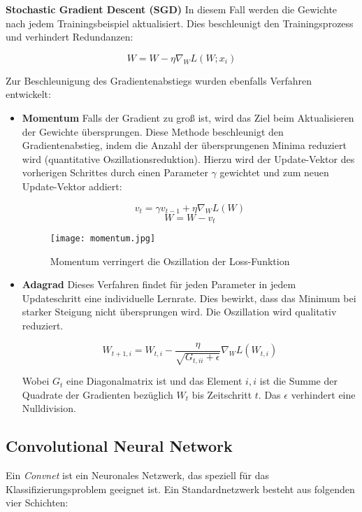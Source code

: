 \documentclass[11pt,ceqn]{book}
\begin{document}
\textbf{Stochastic Gradient Descent (SGD)}
In diesem Fall werden die Gewichte nach jedem Trainingsbeispiel aktualisiert. Dies beschleunigt den Trainingsprozess und verhindert Redundanzen:

\[W=W - \eta \nabla_W L(W;x_i)\]

\bigskip
Zur Beschleunigung des Gradientenabstiegs wurden ebenfalls Verfahren entwickelt:
\begin{itemize}
\item \textbf{Momentum} Falls der Gradient zu groß ist, wird das Ziel beim Aktualisieren der Gewichte übersprungen. Diese Methode beschleunigt den Gradientenabstieg, indem die Anzahl der übersprungenen Minima reduziert wird (quantitative Oszillationsreduktion). Hierzu wird der Update-Vektor des vorherigen Schrittes durch einen Parameter $\gamma$ gewichtet und zum neuen Update-Vektor addiert:

\[v_t=\gamma v_{t-1}+\eta \nabla_WL(W)\]
\[W=W-v_t\]

\begin{figure}[H]
\centering
\texttt{[image: momentum.jpg]}
\caption{Momentum verringert die Oszillation der Loss-Funktion}
\end{figure}



\item \textbf{Adagrad} Dieses Verfahren findet für jeden Parameter in jedem Updateschritt eine individuelle Lernrate. Dies bewirkt, dass das Minimum bei starker Steigung nicht übersprungen wird. Die Oszillation wird qualitativ reduziert.

\[W_{t+1,i}= W_{t,i} - \frac{\eta}{\sqrt{G_{t,ii}+\epsilon}} \nabla_W L(W_{t,i})\]

Wobei $G_{t}$ eine Diagonalmatrix ist und das Element $i,i$ ist die Summe der Quadrate der Gradienten bezüglich $W_t$ bis Zeitschritt $t$. Das $\epsilon$ verhindert eine Nulldivision.
\end{itemize}

\subsection{Convolutional Neural Network}
Ein \textit{Convnet} ist ein Neuronales Netzwerk, das speziell für das Klassifizierungsproblem geeignet ist. Ein Standardnetzwerk besteht aus folgenden vier Schichten:
\end{document}
